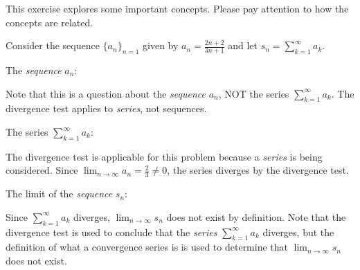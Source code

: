 \documentclass{ximera}
\author{Jim Talamo}
\begin{document}
\begin{exercise}
This exercise explores some important concepts.  Please pay attention to how the concepts are related.

Consider the sequence $\{a_n\}_{n=1}$ given by $a_n = \frac{2n+2}{3n+1}$ and let $s_n = \sum_{k=1}^{\infty} a_k$.

The \emph{sequence} $a_n$:

\begin{multipleChoice}
\end{multipleChoice}

\begin{feedback}
Note that this is a question about the \emph{sequence} $a_n$, NOT the series $\sum_{k=1}^{\infty} a_k$.  The divergence test applies to \emph{series}, not sequences.
\end{feedback}

The series $\sum_{k=1}^{\infty} a_k$:

\begin{multipleChoice}
\end{multipleChoice}

\begin{feedback}
The divergence test is applicable for this problem because a \emph{series} is being considered.  Since $\lim_{n \to \infty} a_n =  \frac{2}{3} \neq 0$, the series diverges by the divergence test.
\end{feedback}



The limit of the \emph{sequence} $s_n$:

\begin{multipleChoice}
\end{multipleChoice}
\begin{feedback}
Since $\sum_{k=1}^{\infty} a_k$ diverges, $\lim_{n \to \infty} s_n$ does not exist by definition.  Note that the divergence test is used to conclude that the \emph{series} $\sum_{k=1}^{\infty} a_k$ diverges, but the definition of what a convergence series is is used to determine that $\lim_{n \to \infty} s_n$ does not exist.
\end{feedback}
\end{exercise}
\end{document}
